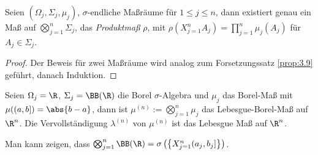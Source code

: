 \begin{prop}
\label{prop:3.49}
Seien $(\Omega_j,\Sigma_j,\mu_j)$, $\sigma$-endliche Maßräume für
$1\le j\le n$, dann existiert genau ein Maß auf
$\bigotimes_{j=1}^n \Sigma_j$, das \emph{Produktmaß} $\rho$, mit
$\rho(X_{j=1}^n A_j) = \prod_{j=1}^n \mu_j(A_j)$ für
$A_j\in\Sigma_j$.\fishhere 
\end{prop}
\begin{proof}
Der Beweis für zwei Maßräume wird analog zum Forsetzungssatz \ref{prop:3.9}
geführt, danach Induktion.\qedhere 
\end{proof}

\begin{prop}[Spezialfall]
\label{prop:3.50}
Seien $\Omega_j = \R$, $\Sigma_j = \BB(\R)$ die Borel $\sigma$-Algebra und
$\mu_j$ das Borel-Maß mit $\mu((a,b]) = \abs{b-a}$, dann ist $\mu^{(n)}:=
\bigotimes_{j=1}^n \mu_j$ das Lebesgue-Borel-Maß auf $\R^n$. Die
Vervollständigung $\lambda^{(n)}$ von $\mu^{(n)}$ ist das Lebesgue Maß auf
$\R^n$.

Man kann zeigen, dass $\bigotimes_{j=1}^n \BB(\R) =
\sigma\left(\left\{X_{j=1}^n (a_j,b_j] \right\} \right)$.\fishhere
\end{prop}


